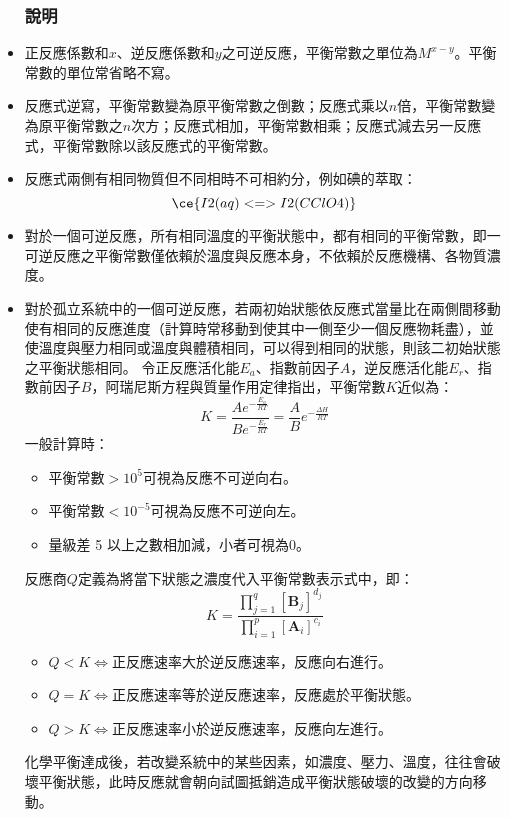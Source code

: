 \documentclass[a4paper,12pt]{report}
\begin{document}
\begin{itemize}
\subsubsection{說明}
\bit
\item 正反應係數和$x$、逆反應係數和$y$之可逆反應，平衡常數之單位為$M^{x-y}$。平衡常數的單位常省略不寫。
\item 反應式逆寫，平衡常數變為原平衡常數之倒數；反應式乘以$n$倍，平衡常數變為原平衡常數之$n$次方；反應式相加，平衡常數相乘；反應式減去另一反應式，平衡常數除以該反應式的平衡常數。
\item 反應式兩側有相同物質但不同相時不可相約分，例如碘的萃取：
\[\ce{I2(aq) <=> I2(CClO4)}\]
\item 對於一個可逆反應，所有相同溫度的平衡狀態中，都有相同的平衡常數，即一可逆反應之平衡常數僅依賴於溫度與反應本身，不依賴於反應機構、各物質濃度。
\item 對於孤立系統中的一個可逆反應，若兩初始狀態依反應式當量比在兩側間移動使有相同的反應進度（計算時常移動到使其中一側至少一個反應物耗盡），並使溫度與壓力相同或溫度與體積相同，可以得到相同的狀態，則該二初始狀態之平衡狀態相同。
\eit
{}
令正反應活化能$E_a$、指數前因子$A$，逆反應活化能$E_r$、指數前因子$B$，阿瑞尼斯方程與質量作用定律指出，平衡常數$K$近似為：
\[K=\frac{Ae^{-\frac{E_a}{RT}}}{Be^{-\frac{E_r}{RT}}}=\frac{A}{B}e^{-\frac{\Delta H}{RT}}\]
一般計算時：
\begin{itemize}
\item 平衡常數$>10^5$可視為反應不可逆向右。
\item 平衡常數$<10^{-5}$可視為反應不可逆向左。
\item 量級差 5 以上之數相加減，小者可視為0。
\end{itemize}
反應商$Q$定義為將當下狀態之濃度代入平衡常數表示式中，即：
\[K=\frac{\prod_{j=1}^q[\mathbf{B}_j]^{d_j}}{\prod_{i=1}^p[\mathbf{A}_i]^{c_i}}\]
\begin{itemize}
\item $Q<K\iff$正反應速率大於逆反應速率，反應向右進行。
\item $Q=K\iff$正反應速率等於逆反應速率，反應處於平衡狀態。
\item $Q>K\iff$正反應速率小於逆反應速率，反應向左進行。
\end{itemize}
化學平衡達成後，若改變系統中的某些因素，如濃度、壓力、溫度，往往會破壞平衡狀態，此時反應就會朝向試圖抵銷造成平衡狀態破壞的改變的方向移動。
\begin{itemize}

\end{itemize}
\end{itemize}
\end{document}
